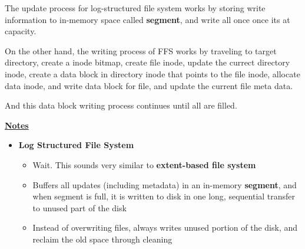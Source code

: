 \documentclass[12pt]{article}
\begin{document}
\begin{enumerate}[1.]
\begin{enumerate}[1)]
        \bigskip

        The update process for log-structured file system works by storing write information
        to in-memory space called \textbf{segment}, and write all once once its at capacity.

        \bigskip

        On the other hand, the writing process of FFS works by traveling to target directory,
        create a inode bitmap, create file inode, update the currect directory inode, create
        a data block in directory inode that points to the file inode, allocate data inode,
        and write data block for file, and update the current file meta data.

        \bigskip

        And this data block writing process continues until all are filled.

        \bigskip

        \underline{\textbf{Notes}}

        \begin{itemize}
            \item \textbf{Log Structured File System}

            \begin{itemize}
                \item Wait. This sounds very similar to \textbf{extent-based file system}
                \item Buffers all updates (including metadata) in an in-memory \textbf{segment},
                and when segment is full, it is written to disk in one long, sequential
                transfer to unused part of the disk
                \item Instead of overwriting files, always writes unused
                portion of the disk, and reclaim the old space through cleaning


\end{itemize}
\end{itemize}
\end{enumerate}
\end{enumerate}
\end{document}
